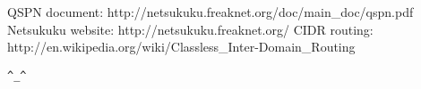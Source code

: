 \documentclass[a4paper]{article}
\newcommand{\href}[2]{ #1 }
\begin{document}
%
%
%


\begin{thebibliography}{99}
	 QSPN document:
		\href{http://netsukuku.freaknet.org/doc/main\_doc/qspn.pdf}{qspn.pdf}
	 Netsukuku website:
		\href{http://netsukuku.freaknet.org/}{http://netsukuku.freaknet.org/}
	 CIDR routing:
		\href{http://en.wikipedia.org/wiki/Classless\_Inter-Domain\_Routing}{Classless\_Inter-Domain\_Routing in Wikipedia}
\end{thebibliography}
\newpage

\begin{center}
\verb|^_^|
\end{center}
\end{document}
